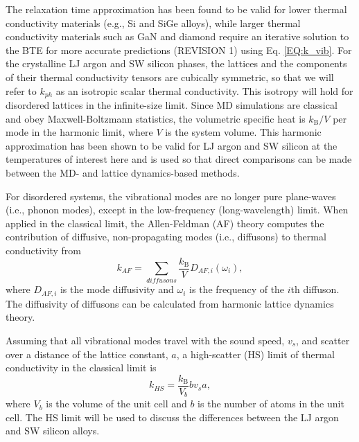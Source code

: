 \documentclass[12pt,twocolumn,iop]{/usr/share/texmf/tex/latex/iop/iopart}[/usr/share/texmf/tex/latex/iop/]
\begin{document}
The relaxation time approximation has been found to be valid  
for lower thermal conductivity materials 
(e.g., Si and SiGe alloys),
\cite{broido_intrinsic_2007,ward_intrinsic_2010,garg_role_2011} 
while larger thermal conductivity 
materials such as GaN and diamond require an  
iterative solution to the BTE for more accurate predictions 
(REVISION 1) using Eq. \eqref{EQ:k_vib}. 
\cite{ward_ab_2009,lindsay_thermal_2012} 
For the crystalline LJ argon and SW silicon phases, 
the lattices and the components of their 
thermal conductivity tensors are cubically symmetric, 
so that we will refer to 
$k_{ph}$ as an isotropic scalar thermal conductivity. 
This isotropy will hold for disordered lattices 
in the infinite-size limit. 
Since MD simulations are classical 
and obey Maxwell-Boltzmann 
statistics,\cite{mcquarrie_statistical_2000} the volumetric 
specific heat is $k_{\text{B}}/V$ per mode in the harmonic limit, where $V$ 
is the system volume. This harmonic approximation has been shown to be valid 
for LJ argon and SW silicon at the temperatures of interest here
\cite{mcgaughey_quantitative_2004,goicochea_thermal_2010} 
and is used so that direct comparisons can be made between 
the MD- and lattice dynamics-based methods.

For disordered systems, the vibrational modes are no 
longer pure plane-waves (i.e., phonon modes), except in the low-frequency 
(long-wavelength) limit. When applied in the classical limit, 
the Allen-Feldman (AF) theory computes 
the contribution of diffusive, non-propagating modes (i.e., diffusons) 
to thermal conductivity from\cite{allen_thermal_1993} 
\begin{equation}\label{EQ:M:k_AF}
k_{AF} = \sum_{diffusons} \frac{k_{\text{B}}}{V} D_{AF,i}(\omega_i),
\end{equation}
where $D_{AF,i}$ is the mode diffusivity and $\omega_i$ is the 
frequency of the $i$th diffuson. The diffusivity of diffusons 
can be calculated from harmonic lattice dynamics theory.
\cite{allen_thermal_1993,feldman_thermal_1993,feldman_numerical_1999} 

Assuming that all vibrational modes travel with the sound speed, $v_s$, and 
scatter over a distance of the lattice constant, $a$, 
a high-scatter (HS) limit of thermal conductivity in the classical 
limit is\cite{cahill_lattice_1988} 
\begin{equation}\label{EQ:M:k_AF,HS}
k_{HS} = \frac{k_{\text{B}}}{V_b}b v_s a,
\end{equation}
where $V_b$ is the volume of the unit cell and $b$ is the number of atoms 
in the unit cell. The HS limit will be used to 
discuss the differences between the LJ argon and SW silicon alloys. 
\end{document}
